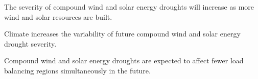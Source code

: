 \documentclass{agujournal2019}
\begin{document}


\begin{keypoints}
\item The severity of compound wind and solar energy droughts will increase as more wind and solar resources are built. 
\item Climate increases the variability of future compound wind and solar energy drought severity. 
\item Compound wind and solar energy droughts are expected to affect fewer load balancing regions simultaneously in the future.
\end{keypoints}

%
%

%
%

\end{document}
